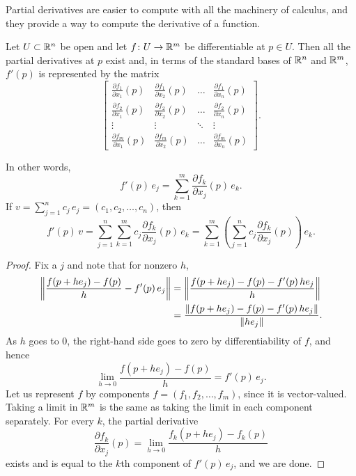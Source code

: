 Partial derivatives are easier to compute with all the machinery of
calculus, and they provide a way to compute the derivative of a
function.

\begin{prop} \label{mv:prop:jacobianmatrix}
Let $U \subset {\mathbb{R}}^n$ be open and let $f \colon U \to {\mathbb{R}}^m$ be
differentiable at $p \in U$.  Then all the partial derivatives at $p$
exist and, in terms of the standard bases of ${\mathbb{R}}^n$ and ${\mathbb{R}}^m$,
$f'(p)$ is represented by the matrix
\begin{equation*}
\begin{bmatrix}
\frac{\partial f_1}{\partial x_1}(p)
&
\frac{\partial f_1}{\partial x_2}(p)
& \ldots &
\frac{\partial f_1}{\partial x_n}(p)
\\[6pt]
\frac{\partial f_2}{\partial x_1}(p)
&
\frac{\partial f_2}{\partial x_2}(p)
& \ldots &
\frac{\partial f_2}{\partial x_n}(p)
\\
\vdots & \vdots & \ddots & \vdots
\\
\frac{\partial f_m}{\partial x_1}(p)
&
\frac{\partial f_m}{\partial x_2}(p)
& \ldots &
\frac{\partial f_m}{\partial x_n}(p)
\end{bmatrix} .
\end{equation*}
\end{prop}


In other words,
\begin{equation*}
f'(p) \, e_j =
\sum_{k=1}^m
\frac{\partial f_k}{\partial x_j}(p) \,e_k .
\end{equation*}
If $v = \sum_{j=1}^n c_j\, e_j = (c_1,c_2,\ldots,c_n)$, then
\begin{equation*}
f'(p) \, v =
\sum_{j=1}^n
\sum_{k=1}^m
 c_j
\frac{\partial f_k}{\partial x_j}(p) \,e_k
=
\sum_{k=1}^m
\left(
\sum_{j=1}^n
 c_j
\frac{\partial f_k}{\partial x_j}(p) \right) \,e_k .
\end{equation*}

\begin{proof}
Fix a $j$ and note that for nonzero $h$,
\begin{equation*}
\begin{split}
\left\lVert {\frac{f(p+h e_j)-f(p)}{h} - f'(p) \, e_j} \right\rVert & = 
\left\lVert {\frac{f(p+h e_j)-f(p) - f'(p) \, h e_j}{h}} \right\rVert \\
& =
\frac{\lVert {f(p+h e_j)-f(p) - f'(p) \, h e_j} \rVert}{\lVert {h e_j} \rVert} .
\end{split}
\end{equation*}
As $h$ goes to 0, the right-hand side goes to zero by
differentiability of $f$, and hence
\begin{equation*}
\lim_{h \to 0}
\frac{f(p+h e_j)-f(p)}{h} = f'(p) \, e_j  .
\end{equation*}
Let us represent $f$ by components
$f = (f_1,f_2,\ldots,f_m)$, since it is vector-valued.
Taking a limit in ${\mathbb{R}}^m$
is the same as taking the limit in each component separately.  
For every $k$,
the partial derivative
\begin{equation*}
\frac{\partial f_k}{\partial x_j} (p)
=
\lim_{h \to 0}
\frac{f_k(p+h e_j)-f_k(p)}{h}
\end{equation*}
exists and is equal to the $k$th component of $f'(p)\, e_j$,
and we are done.
\end{proof}

